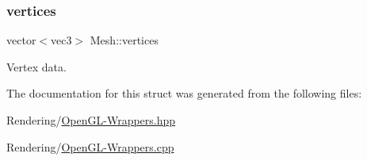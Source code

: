 \subsubsection{\texorpdfstring{vertices}{vertices}}
{\footnotesize\ttfamily vector$<$vec3$>$ Mesh\+::vertices}



Vertex data. 



The documentation for this struct was generated from the following files\+:\begin{DoxyCompactItemize}
\item 
Rendering/\mbox{\hyperlink{OpenGL-Wrappers_8hpp}{Open\+G\+L-\/\+Wrappers.\+hpp}}\item 
Rendering/\mbox{\hyperlink{OpenGL-Wrappers_8cpp}{Open\+G\+L-\/\+Wrappers.\+cpp}}\end{DoxyCompactItemize}
